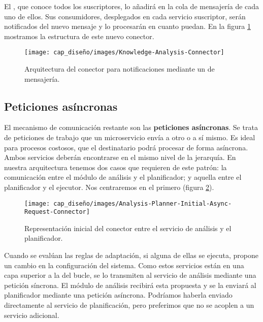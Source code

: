 El , que conoce todos los suscriptores, lo añadirá en la cola de mensajería de cada uno de ellos. Sus consumidores, desplegados en cada servicio suscriptor, serán notificados del nuevo mensaje y lo procesarán en cuanto puedan. En la figura \ref{fig:knowledge-analyisis-connector-architecture} mostramos la estructura de este nuevo conector.

\begin{figure}[h!]
  \centering
  \texttt{[image: cap\_diseño/images/Knowledge-Analysis-Connector]}
  \caption{Arquitectura del conector para notificaciones mediante un  de mensajería.}
  \label{fig:knowledge-analyisis-connector-architecture}
\end{figure}

\subsection{Peticiones asíncronas}

El mecanismo de comunicación restante son las \textbf{peticiones asíncronas}. Se trata de peticiones de trabajo que un microservicio envía a otro o a sí mismo. Es ideal para procesos costosos, que el destinatario podrá procesar de forma asíncrona. Ambos servicios deberán encontrarse en el mismo nivel de la jerarquía. En nuestra arquitectura tenemos dos casos que requieren de este patrón: la comunicación entre el módulo de análisis y el planificador; y aquella entre el planificador y el ejecutor. Nos centraremos en el primero (figura \ref{fig:analyisis-planner-async-request-initial-connector}).

\begin{figure}[H]
  \centering
  \texttt{[image: cap\_diseño/images/Analysis-Planner-Initial-Async-Request-Connector]}
  \caption{Representación inicial del conector entre el servicio de análisis y el planificador.}
  \label{fig:analyisis-planner-async-request-initial-connector}
\end{figure}

Cuando se evalúan las reglas de adaptación, si alguna de ellas se ejecuta, propone un cambio en la configuración del sistema. Como estos servicios están en una capa superior a la del bucle, se lo transmiten al servicio de análisis mediante una petición síncrona. El módulo de análisis recibirá esta propuesta y se la enviará al planificador mediante una petición asíncrona. Podríamos haberla enviado directamente al servicio de planificación, pero preferimos que no se acoplen a un servicio adicional.

